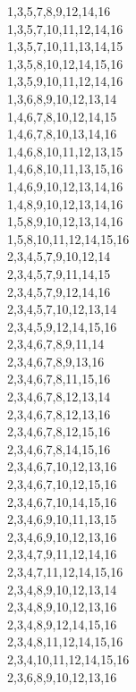 \begin{center}
		1,3,5,7,8,9,12,14,16 \\
		1,3,5,7,10,11,12,14,16 \\
		1,3,5,7,10,11,13,14,15 \\
		1,3,5,8,10,12,14,15,16 \\
		1,3,5,9,10,11,12,14,16 \\
		1,3,6,8,9,10,12,13,14 \\
		1,4,6,7,8,10,12,14,15 \\
		1,4,6,7,8,10,13,14,16 \\
		1,4,6,8,10,11,12,13,15 \\
		1,4,6,8,10,11,13,15,16 \\
		1,4,6,9,10,12,13,14,16 \\
		1,4,8,9,10,12,13,14,16 \\
		1,5,8,9,10,12,13,14,16 \\
		1,5,8,10,11,12,14,15,16 \\
		2,3,4,5,7,9,10,12,14 \\
		2,3,4,5,7,9,11,14,15 \\
		2,3,4,5,7,9,12,14,16 \\
		2,3,4,5,7,10,12,13,14 \\
		2,3,4,5,9,12,14,15,16 \\
		2,3,4,6,7,8,9,11,14 \\
		2,3,4,6,7,8,9,13,16 \\
		2,3,4,6,7,8,11,15,16 \\
		2,3,4,6,7,8,12,13,14 \\
		2,3,4,6,7,8,12,13,16 \\
		2,3,4,6,7,8,12,15,16 \\
		2,3,4,6,7,8,14,15,16 \\
		2,3,4,6,7,10,12,13,16 \\
		2,3,4,6,7,10,12,15,16 \\
		2,3,4,6,7,10,14,15,16 \\
		2,3,4,6,9,10,11,13,15 \\
		2,3,4,6,9,10,12,13,16 \\
		2,3,4,7,9,11,12,14,16 \\
		2,3,4,7,11,12,14,15,16 \\
		2,3,4,8,9,10,12,13,14 \\
		2,3,4,8,9,10,12,13,16 \\
		2,3,4,8,9,12,14,15,16 \\
		2,3,4,8,11,12,14,15,16 \\
		2,3,4,10,11,12,14,15,16 \\
		2,3,6,8,9,10,12,13,16 \\

\end{center}
